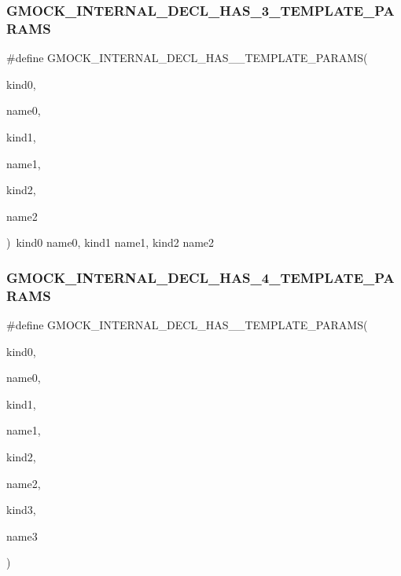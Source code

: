 \subsubsection{\texorpdfstring{GMOCK\_INTERNAL\_DECL\_HAS\_3\_TEMPLATE\_PARAMS}{GMOCK\_INTERNAL\_DECL\_HAS\_3\_TEMPLATE\_PARAMS}}
{\footnotesize\ttfamily \#define G\+M\+O\+C\+K\+\_\+\+I\+N\+T\+E\+R\+N\+A\+L\+\_\+\+D\+E\+C\+L\+\_\+\+H\+A\+S\+\_\+\_\+\+T\+E\+M\+P\+L\+A\+T\+E\+\_\+\+P\+A\+R\+A\+MS(\begin{DoxyParamCaption}\item[{}]{kind0,  }\item[{}]{name0,  }\item[{}]{kind1,  }\item[{}]{name1,  }\item[{}]{kind2,  }\item[{}]{name2 }\end{DoxyParamCaption})~kind0 name0, kind1 name1, kind2 name2}

\mbox{\label{_obj__test_2lib_2googletest-release-1_88_81_2googlemock_2include_2gmock_2gmock-generated-actions_8h_a19b48575600b1a046c3f77d5dfc124ba}} 
\subsubsection{\texorpdfstring{GMOCK\_INTERNAL\_DECL\_HAS\_4\_TEMPLATE\_PARAMS}{GMOCK\_INTERNAL\_DECL\_HAS\_4\_TEMPLATE\_PARAMS}}
{\footnotesize\ttfamily \#define G\+M\+O\+C\+K\+\_\+\+I\+N\+T\+E\+R\+N\+A\+L\+\_\+\+D\+E\+C\+L\+\_\+\+H\+A\+S\+\_\+\_\+\+T\+E\+M\+P\+L\+A\+T\+E\+\_\+\+P\+A\+R\+A\+MS(\begin{DoxyParamCaption}\item[{}]{kind0,  }\item[{}]{name0,  }\item[{}]{kind1,  }\item[{}]{name1,  }\item[{}]{kind2,  }\item[{}]{name2,  }\item[{}]{kind3,  }\item[{}]{name3 }\end{DoxyParamCaption})}

